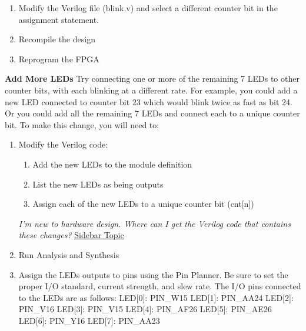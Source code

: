 \begin{flushleft}
\begin{enumerate}[
	leftmargin=*,
	align=left]
\item Modify the Verilog file (blink.v) and select a different counter bit in the assignment statement.

\item Recompile the design

\item Reprogram the FPGA

\end{enumerate}

\textbf{Add More LEDs}
\newline
\newline
Try connecting one or more of the remaining 7 LEDs to other counter bits, with each blinking at a different rate. For example, you could add a new LED connected to counter bit 23 which would blink twice as fast as bit 24. Or you could add all the remaining 7 LEDs and connect each to a unique counter bit.
\newline
\newline
To make this change, you will need to:

\begin{enumerate}[
	leftmargin=*,
	align=left]

\item Modify the Verilog code:
\begin{enumerate}[
	leftmargin=*,
	align=left]

\item Add the new LEDs to the module definition
\item List the new LEDs as being outputs
\item Assign each of the new LEDs to a unique counter bit (cnt[n])

\end{enumerate}

\emph{I'm new to hardware design. Where can I get the Verilog code that contains these changes?} \hyperlink{side9}{\underline{Sidebar Topic}}

\item Run Analysis and Synthesis

\item Assign the LEDs outputs to pins using the Pin Planner.
\newline
\newline
Be sure to set the proper I/O standard, current strength, and slew rate. The I/O pins connected to the LEDs are as follows:
\newline
\newline
LED[0]: PIN\_W15
\newline
LED[1]: PIN\_AA24
\newline
LED[2]: PIN\_V16
\newline
LED[3]: PIN\_V15
\newline
LED[4]: PIN\_AF26
\newline
LED[5]: PIN\_AE26
\newline
LED[6]: PIN\_Y16
\newline
LED[7]: PIN\_AA23


\end{enumerate}
\end{flushleft}
